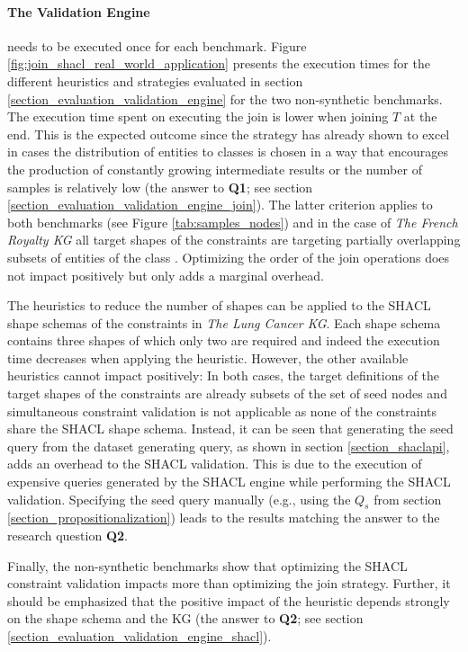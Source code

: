 \paragraph{The Validation Engine} needs to be executed once for each benchmark. Figure \ref{fig:join_shacl_real_world_application} presents the execution times for the different heuristics and strategies evaluated in section \ref{section_evaluation_validation_engine} for the two non-synthetic benchmarks. The execution time spent on executing the join is lower when joining $T$ at the end. This is the expected outcome since the strategy has already shown to excel in cases the distribution of entities to classes is chosen in a way that encourages the production of constantly growing intermediate results or the number of samples is relatively low (the answer to \textbf{Q1}; see section \ref{section_evaluation_validation_engine_join}). The latter criterion applies to both benchmarks (see Figure \ref{tab:samples_nodes}) and in the case of \textit{The French Royalty KG} all target shapes of the constraints are targeting partially overlapping subsets of entities of the class . Optimizing the order of the join operations does not impact positively but only adds a marginal overhead.

The heuristics to reduce the number of shapes can be applied to the SHACL shape schemas of the constraints in \textit{The Lung Cancer KG}. Each shape schema contains three shapes of which only two are required and indeed the execution time decreases when applying the heuristic. 
However, the other available heuristics cannot impact positively: In both cases, the target definitions of the target shapes of the constraints are already subsets of the set of seed nodes and simultaneous constraint validation is not applicable as none of the constraints share the SHACL shape schema. Instead, it can be seen that generating the seed query from the dataset generating query, as shown in section \ref{section_shaclapi}, adds an overhead to the SHACL validation. This is due to the execution of expensive queries generated by the SHACL engine while performing the SHACL validation. Specifying the seed query manually (e.g., using the $Q_s$ from section \ref{section_propositionalization}) leads to the results matching the answer to the research question \textbf{Q2}. 

Finally, the non-synthetic benchmarks show that optimizing the SHACL constraint validation impacts more than optimizing the join strategy. Further, it should be emphasized that the positive impact of the heuristic depends strongly on the shape schema and the KG (the answer to \textbf{Q2}; see section \ref{section_evaluation_validation_engine_shacl}).


